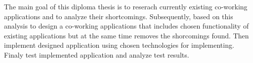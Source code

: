 The main goal of this diploma thesis is to reserach currently existing co-working applications and to analyze their shortcomings. Subsequently, based on this analysis to design a co-working applications that includes chosen functionality of existing applications but at the same time removes the shorcomings found. Then implement designed application using chosen technologies for implementing. Finaly test implemented application and analyze test results.